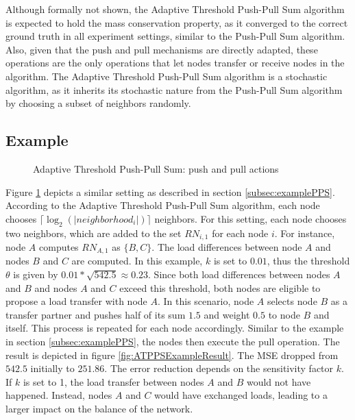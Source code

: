 Although formally not shown, the Adaptive Threshold Push-Pull Sum algorithm is expected to hold the mass conservation property, as it converged to the correct ground truth in all experiment settings, similar to the Push-Pull Sum algorithm. Also, given that the push and pull mechanisms are directly adapted, these operations are the only operations that let nodes transfer or receive nodes in the algorithm. The Adaptive Threshold Push-Pull Sum algorithm is a stochastic algorithm, as it inherits its stochastic nature from the Push-Pull Sum algorithm by choosing a subset of neighbors randomly.



\subsection{Example}\label{subsec:exampleAdaptiveThresholdPPS}
\begin{figure}
    \centering
    \scalebox{0.75}{}
    \caption{Adaptive Threshold Push-Pull Sum: push and pull actions}
    \label{fig:ATPPSExampleSetting}
\end{figure}

Figure \ref{fig:ATPPSExampleSetting} depicts a similar setting as described in section \ref{subsec:examplePPS}. According to the Adaptive Threshold Push-Pull Sum algorithm, each node chooses $\lceil \log_{2}{(|neighborhood_{i}|)} \rceil$ neighbors. For this setting, each node chooses two neighbors, which are added to the set $RN_{i,1}$ for each node $i$. For instance, node $A$ computes $RN_{A,1}$ as $\{B,C\}$. The load differences between node $A$ and nodes $B$ and $C$ are computed. In this example, $k$ is set to $0.01$, thus the threshold $\theta$ is given by $0.01*\sqrt{542.5} \approx 0.23$. Since both load differences between nodes $A$ and $B$ and nodes $A$ and $C$ exceed this threshold, both nodes are eligible to propose a load transfer with node $A$. In this scenario, node $A$ selects node $B$ as a transfer partner and pushes half of its sum $1.5$ and weight $0.5$ to node $B$ and itself. This process is repeated for each node accordingly. Similar to the example in section \ref{subsec:examplePPS}, the nodes then execute the pull operation. The result is depicted in figure \ref{fig:ATPPSExampleResult}. The MSE dropped from $542.5$ initially to $251.86$. The error reduction depends on the sensitivity factor $k$. If $k$ is set to 1, the load transfer between nodes $A$ and $B$ would not have happened. Instead, nodes $A$ and $C$ would have exchanged loads, leading to a larger impact on the balance of the network.

